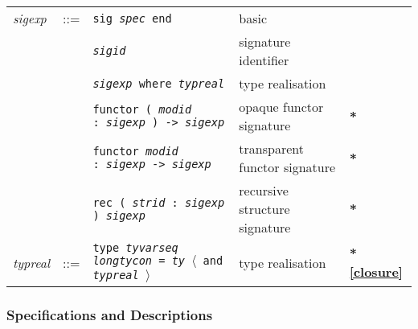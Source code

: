 \documentclass[fleqn]{article}
\newcommand{\x}[1][]{{\bf{*}#1}}
\newcommand{\la}{$\langle$}
\newcommand{\ra}{$\rangle$}
\begin{document}
\begin{tabular}{@{}lllll}
{\it sigexp\/} & ::= & {\tt sig {\it spec\/} end}& basic\\
& & {\tt {\it sigid\/}} & signature identifier \\ 
& & {\tt {\it sigexp\/} where  {\it typreal\/}}& type realisation \\ 
& & {\tt functor ( {\it modid\/} :\ {\it sigexp} ) -> {\it sigexp}}  & opaque functor signature & \x \\
& & {\tt functor {\it modid\/} :\ {\it sigexp\/} -> {\it sigexp}}  & transparent functor signature & \x \\
& & {\tt rec ( {\it strid\/} :\ {\it sigexp} ) {\it sigexp}}  & recursive structure signature & \x \\[2ex]

{\it typreal\/} & ::= & {\tt type {\it tyvarseq\/} {\it longtycon\/} = {\it ty\/}
\la\ and {\it typreal\/} \ra}  & type realisation & \x[\ref{closure}]
\end{tabular}

\subsubsection*{Specifications and Descriptions}
\end{document}
